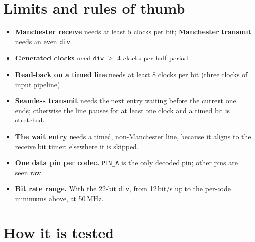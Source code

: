 \documentclass[11pt,a4paper]{article}
\newcommand{\sig}[1]{\texttt{#1}}
\begin{document}
\section{Limits and rules of thumb}

\begin{itemize}
\item \textbf{Manchester receive} needs at least 5 clocks per bit; \textbf{Manchester transmit} needs an even \sig{div}.
\item \textbf{Generated clocks} need \sig{div} $\ge$ 4 clocks per half period.
\item \textbf{Read-back on a timed line} needs at least 8 clocks per bit (three clocks of input pipeline).
\item \textbf{Seamless transmit} needs the next entry waiting before the current one ends; otherwise the line pauses for at least one clock and a timed bit is stretched.
\item \textbf{The wait entry} needs a timed, non-Manchester line, because it aligns to the receive bit timer; elsewhere it is skipped.
\item \textbf{One data pin per codec.} \sig{PIN\_A} is the only decoded pin; other pins are seen raw.
\item \textbf{Bit rate range.} With the 22-bit \sig{div}, from 12\,bit/s up to the per-code minimums above, at 50\,MHz.
\end{itemize}

\section{How it is tested}
\end{document}
